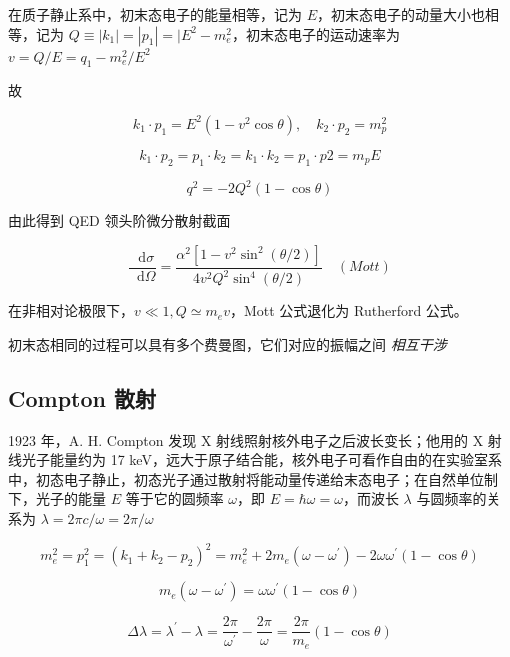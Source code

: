 \documentclass[oneside,a4paper,openany,11pt]{ctexbook}
\newcommand*{\dif}{\mathop{}\!\mathrm{d}} %
\begin{document}
在质子静止系中，初末态电子的能量相等，记为 $E$，初末态电子的动量大小也相等，记为 $Q \equiv |k_1| = |p_1| = |E^2-m^2_e$，初末态电子的运动速率为 $v = Q/E = q_1 - m^2_e/E^2$

故

\begin{equation}
    k_1 \cdot p_1 = E^2(1 - v^2 \cos\theta), \quad k_2 \cdot p_2 = m^2_p
\end{equation}

\begin{equation}
    k_1 \cdot p_2 = p_1 \cdot k_2 = k_1 \cdot k_2 = p_1 \cdot p2 = m_p E
\end{equation}

\begin{equation}
    q^2 = -2 Q^2(1 - \cos\theta)
\end{equation}

由此得到 QED 领头阶微分散射截面

\begin{equation}
    \frac{\dif\sigma}{\dif\Omega} = \frac{\alpha^2 [1-v^2\sin^2(\theta/2)]}{4 v^2 Q^2 \sin^4(\theta/2)} \quad (Mott)
\end{equation}

在非相对论极限下，$v \ll 1, Q \simeq m_e v$，Mott 公式退化为 Rutherford 公式。

初末态相同的过程可以具有多个费曼图，它们对应的振幅之间 \emph{相互干涉}

\subsection{Compton 散射}

1923 年，A. H. Compton 发现 X 射线照射核外电子之后波长变长；他用的 X 射线光子能量约为 17 keV，远大于原子结合能，核外电子可看作自由的在实验室系中，初态电子静止，初态光子通过散射将能动量传递给末态电子；在自然单位制下，光子的能量 $E$ 等于它的圆频率 $\omega$，即 $E = \hbar\omega = \omega$，而波长 $\lambda$ 与圆频率的关系为 $\lambda = 2\pi c/\omega = 2\pi/\omega$

\begin{equation}
    m^2_e = p^2_1 = (k_1+k_2-p_2)^2 = m_e^2 + 2 m_e (\omega-\omega^\prime) - 2\omega\omega^\prime(1-\cos\theta)
\end{equation}

\begin{equation}
    m_e(\omega-\omega^\prime) = \omega\omega^\prime(1-\cos\theta)
\end{equation}

\begin{equation}
    \Delta \lambda = \lambda^\prime - \lambda = \frac{2\pi}{\omega^\prime} - \frac{2\pi}{\omega} = \frac{2\pi}{m_e}(1-\cos\theta)
\end{equation}
\end{document}
